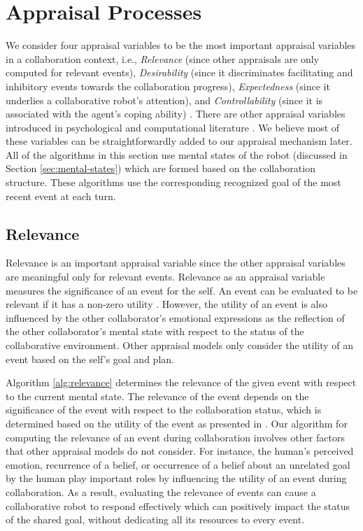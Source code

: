 \documentclass[12pt]{report}
\begin{document}
\section{Appraisal Processes}
\label{sec:appraisal}
We consider four appraisal variables to be the most important appraisal
variables in a collaboration context, i.e., \textit{Relevance} (since other
appraisals are only computed for relevant events), \textit{Desirability}
(since it discriminates facilitating and inhibitory events towards the
collaboration progress), \textit{Expectedness} (since it underlies a
collaborative robot's attention), and \textit{Controllability} (since it is
associated with the agent's coping ability)
\cite{shayganfar:relevance-controllability}. There are other appraisal variables
introduced in psychological \cite{scherer:appraisal-processes} and computational
literature \cite{gratch:domain-independent}. We believe most of these variables
can be straightforwardly added to our appraisal mechanism later. All of the
algorithms in this section use mental states of the robot (discussed in Section
\ref{sec:mental-states}) which are formed based on the collaboration structure.
These algorithms use the corresponding recognized goal of the most recent event
at each turn.

\subsection{Relevance}
Relevance is an important appraisal variable since the other appraisal variables
are meaningful only for relevant events. Relevance as an appraisal variable
measures the significance of an event for the self. An event can be evaluated to
be relevant if it has a non-zero utility \cite{marsella:ema-process-model}.
However, the utility of an event is also influenced by the other collaborator's
emotional expressions as the reflection of the other collaborator's mental state
with respect to the status of the collaborative environment. Other appraisal
models only consider the utility of an event based on the self's goal and plan.

Algorithm \ref{alg:relevance} determines the relevance of the given event with
respect to the current mental state. The relevance of the event depends on the
significance of the event with respect to the collaboration status, which is
determined based on the utility of the event as presented in
\cite{gratch:domain-independent,marsella:ema-process-model}. Our algorithm for
computing the relevance of an event during collaboration involves other factors
that other appraisal models do not consider. For instance, the human's
perceived emotion, recurrence of a belief, or occurrence of a belief about an
unrelated goal by the human play important roles by influencing the utility
of an event during collaboration. As a result, evaluating the relevance of
events can cause a collaborative robot to respond effectively which can
positively impact the status of the shared goal, without dedicating all its
resources to every event.
\end{document}
